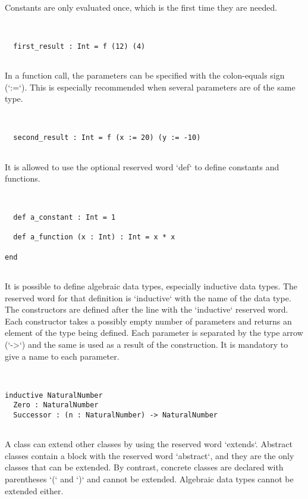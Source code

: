 \documentclass[12pt,a4paper]{article}
\begin{document}
  Constants are only evaluated once, which is the first time they are needed.


\begin{lstlisting}


  first_result : Int = f (12) (4)


\end{lstlisting}

  In a function call, the parameters can be specified with the colon-equals sign (`:=`).
   This is especially recommended when several parameters are of the same type.


\begin{lstlisting}


  second_result : Int = f (x := 20) (y := -10)


\end{lstlisting}

  It is allowed to use the optional reserved word `def` to define constants and functions.


\begin{lstlisting}


  def a_constant : Int = 1

  def a_function (x : Int) : Int = x * x

end


\end{lstlisting}

It is possible to define algebraic data types, especially inductive data types.
 The reserved word for that definition is `inductive` with the name of the data type.
 The constructors are defined after the line with the `inductive` reserved word.
 Each constructor takes a possibly empty number of parameters and returns an element of the type being defined.
 Each parameter is separated by the type arrow (`->`) and the same is used as a result of the construction.
 It is mandatory to give a name to each parameter.



\begin{lstlisting}


inductive NaturalNumber
  Zero : NaturalNumber
  Successor : (n : NaturalNumber) -> NaturalNumber


\end{lstlisting}

A class can extend other classes by using the reserved word `extends`.
 Abstract classes contain a block with the reserved word `abstract`, and they are the only
 classes that can be extended.
 By contrast, concrete classes are declared with parentheses `(` and `)` and cannot be
 extended. Algebraic data types cannot be extended either.
\end{document}
